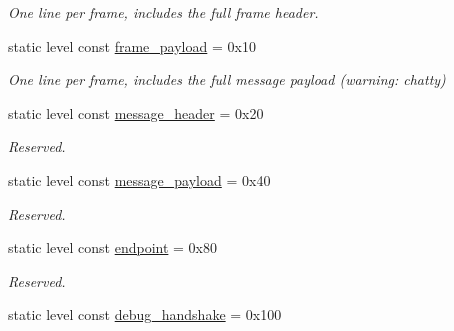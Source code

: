 \begin{DoxyCompactItemize}
\begin{DoxyCompactList}\small\item\em One line per frame, includes the full frame header. \end{DoxyCompactList}\item 
static level const \hyperlink{structwebsocketpp_1_1log_1_1alevel_aa38cfdf7a82f33cac319438462707e90}{frame\+\_\+payload} = 0x10\hypertarget{structwebsocketpp_1_1log_1_1alevel_aa38cfdf7a82f33cac319438462707e90}{}\label{structwebsocketpp_1_1log_1_1alevel_aa38cfdf7a82f33cac319438462707e90}

\begin{DoxyCompactList}\small\item\em One line per frame, includes the full message payload (warning\+: chatty) \end{DoxyCompactList}\item 
static level const \hyperlink{structwebsocketpp_1_1log_1_1alevel_ae05d0972bc4d68cca49faf8c82d40304}{message\+\_\+header} = 0x20\hypertarget{structwebsocketpp_1_1log_1_1alevel_ae05d0972bc4d68cca49faf8c82d40304}{}\label{structwebsocketpp_1_1log_1_1alevel_ae05d0972bc4d68cca49faf8c82d40304}

\begin{DoxyCompactList}\small\item\em Reserved. \end{DoxyCompactList}\item 
static level const \hyperlink{structwebsocketpp_1_1log_1_1alevel_ace7d9b9c9ed82029ec93c4f45081b7ac}{message\+\_\+payload} = 0x40\hypertarget{structwebsocketpp_1_1log_1_1alevel_ace7d9b9c9ed82029ec93c4f45081b7ac}{}\label{structwebsocketpp_1_1log_1_1alevel_ace7d9b9c9ed82029ec93c4f45081b7ac}

\begin{DoxyCompactList}\small\item\em Reserved. \end{DoxyCompactList}\item 
static level const \hyperlink{structwebsocketpp_1_1log_1_1alevel_ad35433a6b8793f2bd1f5595386a09c73}{endpoint} = 0x80\hypertarget{structwebsocketpp_1_1log_1_1alevel_ad35433a6b8793f2bd1f5595386a09c73}{}\label{structwebsocketpp_1_1log_1_1alevel_ad35433a6b8793f2bd1f5595386a09c73}

\begin{DoxyCompactList}\small\item\em Reserved. \end{DoxyCompactList}\item 
static level const \hyperlink{structwebsocketpp_1_1log_1_1alevel_a5756fbbc77e431534a43072f944283fc}{debug\+\_\+handshake} = 0x100\hypertarget{structwebsocketpp_1_1log_1_1alevel_a5756fbbc77e431534a43072f944283fc}{}\label{structwebsocketpp_1_1log_1_1alevel_a5756fbbc77e431534a43072f944283fc}


\end{DoxyCompactItemize}
